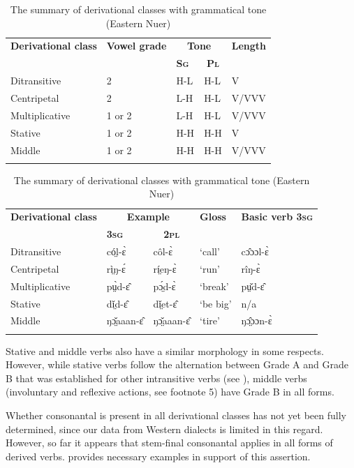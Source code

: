 \documentclass[output=paper,newtxmath,modfonts,nonflat]{langsci/langscibook}
\begin{document}
\begin{table}
\begin{tabularx}{\textwidth}{Xllll}
\lsptoprule

\bfseries Derivational class & \bfseries Vowel grade & \multicolumn{2}{c}{\bfseries Tone} & {\bfseries Length}\\
&  & \bfseries\scshape Sg & \multicolumn{1}{c}{\bfseries\scshape Pl} &\\
\midrule
Ditransitive & 2 & H-L & H-L & V\\
Centripetal & 2 & L-H & H-L & V/VVV\\
Multiplicative & 1 or 2 & L-H & H-L & V/VVV\\
Stative & 1 or 2 & H-H & H-H & V\\
Middle & 1 or 2 & H-H & H-H & V/VVV\\
\lspbottomrule
\end{tabularx}
\begin{tabularx}{\textwidth}{Xllll}
\bfseries Derivational class & \multicolumn{2}{c}{\bfseries Example} & \bfseries Gloss & {\bfseries Basic  verb 3\textsc{sg}} \\
& \bfseries\scshape 3sg & \multicolumn{1}{c}{\bfseries\scshape 2pl} &  & \\
\midrule
Ditransitive & có̤l-ɛ̀ & côl-ɛ̀ & ‘call’ & cɔ̂ɔɔl-ɛ̀\\
Centripetal & rì̤ŋ-ɛ́ & rí̤eŋ-ɛ̀& ‘run’ & rîŋ-ɛ̀\\
Multiplicative & pṳ̀d-ɛ̂ & pɔ̤́d-ɛ̀ & ‘break’ & pṳ̌d-ɛ̂\\
Stative & dǐ̤d-ɛ̂ & dǐ̤et-ɛ̂ & ‘be big’ & n/a\\
Middle & ŋɔ̤̌aaan-ɛ̂ & ŋɔ̤̌aaan-ɛ̂ & ‘tire’ & ŋɔ̤̂ɔɔn-ɛ̀\\
\lspbottomrule
\end{tabularx}
\caption{The summary of derivational classes with grammatical tone (Eastern Nuer)}
\label{tab:monich:15}
\end{table}

Stative and middle verbs also have a similar morphology in some respects. However, while stative verbs follow the alternation between Grade A and Grade B that was established for other intransitive verbs (see ), middle verbs (involuntary and reflexive actions, see footnote 5) have Grade B in all forms.

Whether consonantal  is present in all derivational classes has not yet been fully determined, since our data from Western  dialects is limited in this regard. However, so far it appears that stem-final consonantal  applies in all forms of derived verbs.  provides necessary examples in support of this assertion. 
\end{document}
